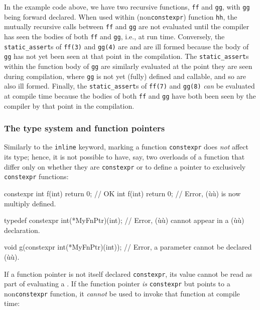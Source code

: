 \noindent In the example code above, we have two recursive functions, \lstinline!ff!
and \lstinline!gg!, with \lstinline!gg! being forward declared. When used
within (non\lstinline!constexpr!) function \lstinline!hh!, the mutually
recursive calls between \lstinline!ff! and \lstinline!gg! are not evaluated
until the compiler has seen the bodies of both \lstinline!ff! and
\lstinline!gg!, i.e., at run time. Conversely, the \lstinline!static_assert!s
of \lstinline!ff(3)! and \lstinline!gg(4)! are  and are ill formed because the body of \lstinline!gg! has not yet
been seen at that point in the compilation. The \lstinline!static_assert!s
within the function body of \lstinline!gg! are similarly evaluated at the
point they are seen during compilation, where \lstinline!gg! is not yet
(fully) defined and callable, and so are also ill formed. Finally, the
\lstinline!static_assert!s of \lstinline!ff(7)! and \lstinline!gg(8)! \emph{can}
be evaluated at compile time because the bodies of both \lstinline!ff! and
\lstinline!gg! have both been seen by the compiler by that point in the
compilation.

\subsubsection[The type system and function pointers]{The type system and function pointers}\label{the-type-system-and-function-pointers}

Similarly to the \lstinline!inline! keyword, marking a function
\lstinline!constexpr! does \emph{not} affect its type; hence, it is not
possible to have, say, two overloads of a function that differ only on
whether they are \lstinline!constexpr! or to define a pointer to
exclusively \lstinline!constexpr! functions:

\begin{emcppslisting}
constexpr int f(int) { return 0; }  // OK
int f(int)           { return 0; }  // Error, (ù{}ù) is now multiply defined.

typedef constexpr int(*MyFnPtr)(int);
    // Error, (ù{}ù) cannot appear in a (ù{}ù) declaration.

void g(constexpr int(*MyFnPtr)(int));
    // Error, a parameter cannot be declared (ù{}ù).
\end{emcppslisting}


\noindent If a function pointer is not itself declared \lstinline!constexpr!, its
value cannot be read as part of evaluating a . If the function pointer \emph{is} \lstinline!constexpr! but
points to a non\lstinline!constexpr! function, it \emph{cannot} be used to
invoke that function at compile time:

